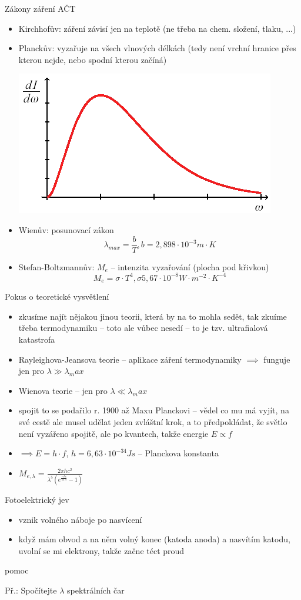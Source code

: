 \documentclass{article}
\begin{document}
Zákony záření AČT
\begin{itemize}
    \item Kirchhofův: záření závisí jen na teplotě (ne třeba na chem. složení, tlaku, ...)
    \item Planckův: vyzařuje na všech vlnových délkách (tedy není vrchní hranice přes kterou nejde, nebo spodní kterou začíná)
    \begin{center}
        \includegraphics[width=0.5\linewidth]{act.png}
    \end{center}
    \item Wienův: posunovací zákon
    \[
        \lambda_{max} = \frac{b}{T}, b = 2,898 \cdot 10^{-3} m\cdot K
    \]
    \item Stefan-Boltzmannův: $M_e$ -- intenzita vyzařování (plocha pod křivkou)
    \[
        M_e = \sigma \cdot T^4, \sigma 5,67 \cdot 10^{-8} W\cdot m^{-2}\cdot K^{-4}
    \]
\end{itemize}

Pokus o teoretické vysvětlení
\begin{itemize}
    \item zkusíme najít nějakou jinou teorii, která by na to mohla sedět, tak zkuíme třeba termodynamiku -- toto ale vůbec nesedí -- to je tzv. ultrafialová katastrofa
    \item Rayleighova-Jeansova teorie -- aplikace záření termodynamiky $\implies$ funguje jen pro $\lambda \gg \lambda_max$
    \item Wienova teorie -- jen pro $\lambda \ll \lambda_max$
    \item spojit to se podařilo r. 1900 až Maxu Planckovi -- vědel co mu má vyjít, na své cestě ale musel udělat jeden zvláštní krok, a to předpokládat, že světlo není vyzářeno spojitě, ale po kvantech, takže energie $E \propto f$
    \item $\implies E = h \cdot f$, $h = 6,63 \cdot 10^{-34} Js$ -- Planckova konstanta
    \item $M_{e, \lambda} = \frac{2 \pi hc^2}{\lambda^{5}(e^{\frac{-hc}{kT\lambda}}-1)}$
\end{itemize}

Fotoelektrický jev
\begin{itemize}
    \item vznik volného náboje po nasvícení
    \item když mám obvod a na něm volný konec (katoda anoda) a nasvítím katodu, uvolní se mi elektrony, takže začne téct proud
\end{itemize}

pomoc

Př.: Spočítejte $\lambda$ spektrálních čar
\end{document}

